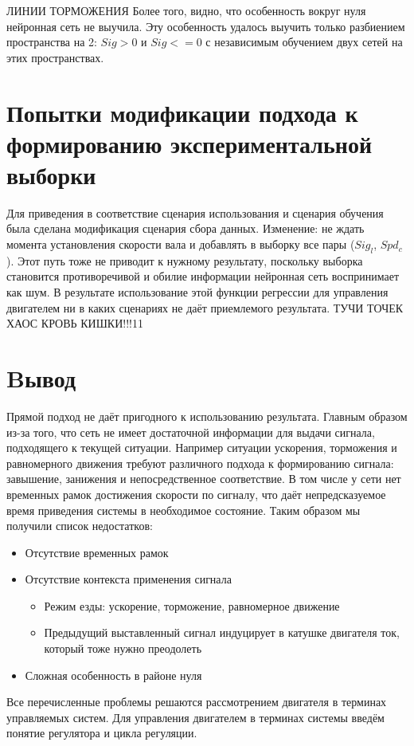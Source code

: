 \documentclass[14pt]{extreport}
\begin{document}
                { ЛИНИИ ТОРМОЖЕНИЯ}
                Более того, видно, что особенность вокруг нуля нейронная сеть не выучила. Эту особенность удалось выучить только разбиением пространства на 2: $Sig>0$ и $Sig<=0$ с независимым обучением двух сетей на этих пространствах.
            \section{Попытки модификации подхода к формированию экспериментальной выборки}
                Для приведения в соответствие сценария использования и сценария обучения была сделана модификация сценария сбора данных. Изменение: не ждать момента установления скорости вала и добавлять в выборку все пары ($Sig_l$, $Spd_c$). Этот путь тоже не приводит к нужному результату, поскольку выборка становится противоречивой и обилие информации нейронная сеть воспринимает как шум. В результате использование этой функции регрессии для управления двигателем ни в каких сценариях не даёт приемлемого результата.
                { ТУЧИ ТОЧЕК ХАОС КРОВЬ КИШКИ!!!11}
            \section{Bывод}
                Прямой подход не даёт пригодного к использованию результата. Главным образом из-за того, что сеть не имеет достаточной информации для выдачи сигнала, подходящего к текущей ситуации. Например ситуации ускорения, торможения и равномерного движения требуют различного подхода к формированию сигнала: завышение, занижения и непосредственное соответствие. В том числе у сети нет временных рамок достижения скорости по сигналу, что даёт непредсказуемое время приведения системы в необходимое состояние. Таким образом мы получили список недостатков:
                \begin{itemize}
                  \item Отсутствие временных рамок
                  \item Отсутствие контекста применения сигнала
                      \begin{itemize}
                        \item Режим езды: ускорение, торможение, равномерное движение
                        \item Предыдущий выставленный сигнал индуцирует в катушке двигателя ток, который тоже нужно преодолеть
                      \end{itemize}
                  \item Сложная особенность в районе нуля
                \end{itemize}
                Все перечисленные проблемы решаются рассмотрением двигателя в терминах управляемых систем. Для управления двигателем в терминах системы введём понятие регулятора и цикла регуляции.
\end{document}
